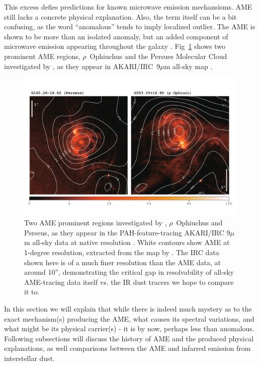         This excess defies predictions for known microwave emission mechansisms. AME still lacks a concrete physical explanation. Also, the term itself can be a bit confusing, as the word ``anomalous'' tends to imply localized outlier. The AME is shown to be more than an isolated anomaly, but an added component of microwave emission appearing throughout the galaxy \citep{deoliveiracosta97,wmap03b,dickinson13r}. Fig~\ref{fig:AME_contours} shows two prominent AME regions, $\rho{}$~Ophiuchus and the Persues Molecular Cloud investigated by \cite{tibbs11,planckxx11}, as they appear in AKARI/IRC~9$\mu$m all-sky map \citep{ishihara10}.
            \begin{figure}
              \centering
              \includegraphics[width=\textwidth]{../Plots/ch_intro/AME_contours.pdf}
                \caption{Two AME prominent regions investigated by \cite{planckxx11, tibbs11}, $\rho$~Ophiuchus and Perseus, as they appear in the PAH-feature-tracing AKARI/IRC 9$\mu$m all-sky data at native resolution \citep{ishihara10}. White contours show AME at 1-degree resolution, extracted from the map by  \cite{planck15X}. The IRC data shown here is of a much finer resolution than the AME data, at around 10'', demonstrating the critical gap in resolvability of all-sky AME-tracing data itself vs. the IR dust tracers we hope to compare it to. }
              \label{fig:AME_contours}
            \end{figure}
        In this section we will explain that while there is indeed much mystery as to the exact mechanism(s) producing the AME, what causes its spectral variations, and what might be its physical carrier(s) - it is by now, perhaps less than anomalous. Following subsections will discuss the history of AME and the produced physical explanations, as well comparisons between the AME and infarred emission from interstellar dust.

